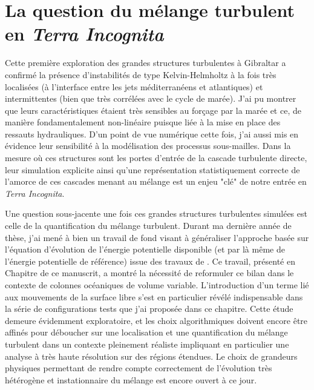 \section{La question du mélange turbulent en \textit{Terra Incognita}}
Cette première exploration des grandes structures turbulentes à Gibraltar a confirmé la présence d'instabilités de type Kelvin-Helmholtz à la fois très localisées (à l'interface entre les jets méditerranéens et atlantiques) et intermittentes (bien que très corrélées avec le cycle de marée). J'ai pu montrer que leurs caractéristiques étaient très sensibles au forçage par la marée et ce, de manière fondamentalement non-linéaire puisque liée à la mise en place des ressauts hydrauliques. D'un point de vue numérique cette fois, j'ai aussi mis en évidence leur sensibilité à la modélisation des processus sous-mailles.
Dans la mesure où ces structures sont les portes d'entrée de la cascade turbulente directe, leur simulation explicite ainsi qu'une représentation statistiquement correcte de l'amorce de ces cascades menant au mélange est un enjeu "clé" de notre entrée en \textit{Terra Incognita}.


Une question sous-jacente une fois ces grandes structures turbulentes simulées est celle de la quantification du mélange turbulent. Durant ma dernière année de thèse, j'ai mené à bien un travail de fond visant à généraliser l'approche basée sur l'équation d'évolution de l'énergie potentielle disponible (et par là même de l'énergie potentielle de référence) issue des travaux de \cite{lorenz_available_1955}. Ce travail, présenté en Chapitre  de ce manuscrit, a montré la nécessité de reformuler ce bilan dans le contexte de colonnes océaniques de volume variable. L'introduction d'un terme lié aux mouvements de la surface libre s'est en particulier révélé indispensable dans la série de configurations tests que j'ai proposée dans ce chapitre. %
Cette étude demeure évidemment exploratoire, et les choix algorithmiques doivent encore être affinés pour déboucher sur une localisation et une quantification du mélange turbulent dans un contexte pleinement réaliste impliquant en particulier une analyse à très haute résolution sur des régions étendues. Le choix de grandeurs physiques permettant de rendre compte correctement de l'évolution très hétérogène et instationnaire du mélange est encore ouvert à ce jour.


